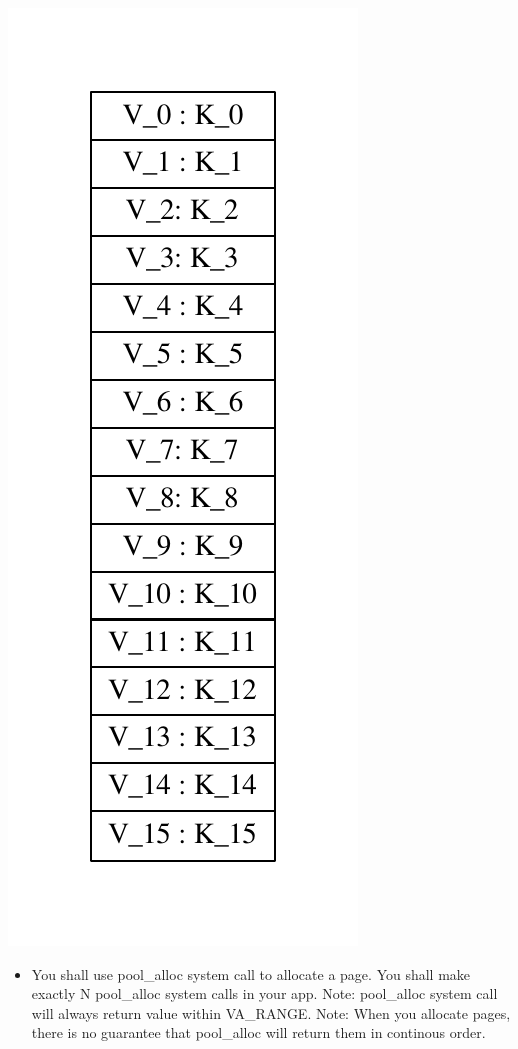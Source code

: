 \documentclass[]{book}
\begin{document}
\includegraphics{graphviz-images/925fb07dd8a75351299f096096fd68d723c5a480.pdf}

\begin{itemize}
\itemsep1pt\parskip0pt
\item
  You shall use pool\_alloc system call to allocate a page. You shall
  make exactly N pool\_alloc system calls in your app. Note: pool\_alloc
  system call will always return value within VA\_RANGE. Note: When you
  allocate pages, there is no guarantee that pool\_alloc will return
  them in continous order.
\end{itemize}
\end{document}
